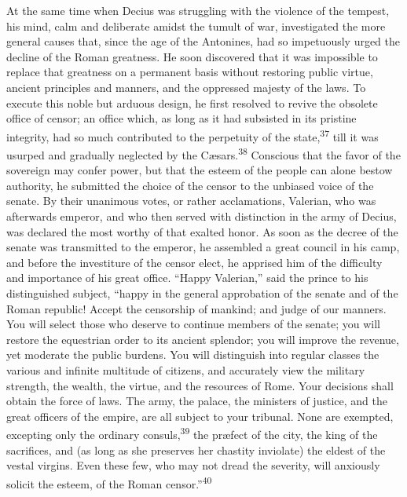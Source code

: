 At the same time when Decius was struggling with the violence of
the tempest, his mind, calm and deliberate amidst the tumult of
war, investigated the more general causes that, since the age of
the Antonines, had so impetuously urged the decline of the Roman
greatness. He soon discovered that it was impossible to replace
that greatness on a permanent basis without restoring public
virtue, ancient principles and manners, and the oppressed majesty
of the laws. To execute this noble but arduous design, he first
resolved to revive the obsolete office of censor; an office
which, as long as it had subsisted in its pristine integrity, had
so much contributed to the perpetuity of the state,\textsuperscript{37} till it
was usurped and gradually neglected by the Cæsars.\textsuperscript{38} Conscious
that the favor of the sovereign may confer power, but that the
esteem of the people can alone bestow authority, he submitted the
choice of the censor to the unbiased voice of the senate. By
their unanimous votes, or rather acclamations, Valerian, who was
afterwards emperor, and who then served with distinction in the
army of Decius, was declared the most worthy of that exalted
honor. As soon as the decree of the senate was transmitted to the
emperor, he assembled a great council in his camp, and before the
investiture of the censor elect, he apprised him of the
difficulty and importance of his great office. “Happy Valerian,”
said the prince to his distinguished subject, “happy in the
general approbation of the senate and of the Roman republic!
Accept the censorship of mankind; and judge of our manners. You
will select those who deserve to continue members of the senate;
you will restore the equestrian order to its ancient splendor;
you will improve the revenue, yet moderate the public burdens.
You will distinguish into regular classes the various and
infinite multitude of citizens, and accurately view the military
strength, the wealth, the virtue, and the resources of Rome. Your
decisions shall obtain the force of laws. The army, the palace,
the ministers of justice, and the great officers of the empire,
are all subject to your tribunal. None are exempted, excepting
only the ordinary consuls,\textsuperscript{39} the præfect of the city, the king
of the sacrifices, and (as long as she preserves her chastity
inviolate) the eldest of the vestal virgins. Even these few, who
may not dread the severity, will anxiously solicit the esteem, of
the Roman censor.”\textsuperscript{40}


